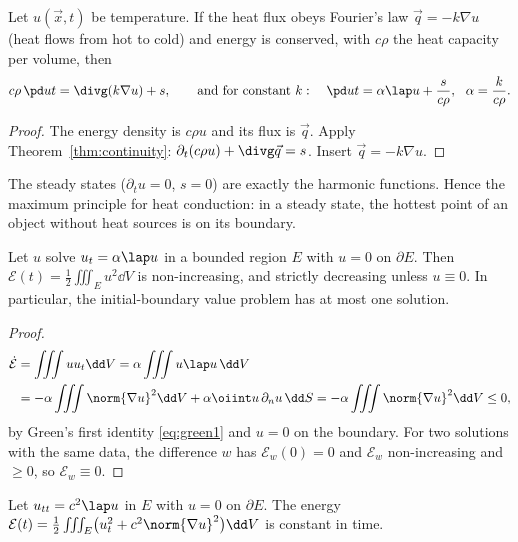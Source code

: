 \begin{theorem}\label{thm:heat}
Let $u(\vec x,t)$ be temperature. If the heat flux obeys Fourier's law $\vec q=-k\nabla u$ (heat flows from hot to cold) and energy is conserved, with $c\rho$ the heat capacity per volume, then
\[
c\rho\,\pd ut=\divg(k\nabla u)+s,\qquad\text{and for constant }k:\quad\pd ut=\alpha\lap u+\frac s{c\rho},\ \ \alpha=\frac k{c\rho}.
\]
\end{theorem}

\begin{proof}
The energy density is $c\rho u$ and its flux is $\vec q$. Apply Theorem~\ref{thm:continuity}: $\partial_t(c\rho u)+\divg\vec q=s$. Insert $\vec q=-k\nabla u$.
\end{proof}

The steady states ($\partial_tu=0$, $s=0$) are exactly the harmonic functions. Hence the maximum principle for heat conduction: in a steady state, the hottest point of an object without heat sources is on its boundary.

\begin{theorem}\label{thm:heatdecay}
Let $u$ solve $u_t=\alpha\lap u$ in a bounded region $E$ with $u=0$ on $\partial E$. Then $\mathcal E(t)=\frac12\iiint_Eu^2\dd V$ is non-increasing, and strictly decreasing unless $u\equiv0$. In particular, the initial-boundary value problem has at most one solution.
\end{theorem}

\begin{proof}
\begin{align*}
\dot{\mathcal E}&=\iiint uu_t\dd V=\alpha\iiint u\lap u\,\dd V\\
&=-\alpha\iiint\norm{\nabla u}^2\dd V+\alpha\oiint u\,\partial_nu\,\dd S=-\alpha\iiint\norm{\nabla u}^2\dd V\le0,
\end{align*}
by Green's first identity \eqref{eq:green1} and $u=0$ on the boundary. For two solutions with the same data, the difference $w$ has $\mathcal E_w(0)=0$ and $\mathcal E_w$ non-increasing and $\ge0$, so $\mathcal E_w\equiv0$.
\end{proof}

\begin{theorem}\label{thm:waveenergy}
Let $u_{tt}=c^2\lap u$ in $E$ with $u=0$ on $\partial E$. The energy $\mathcal E(t)=\frac12\iiint_E\bigl(u_t^2+c^2\norm{\nabla u}^2\bigr)\dd V$ is constant in time.
\end{theorem}

